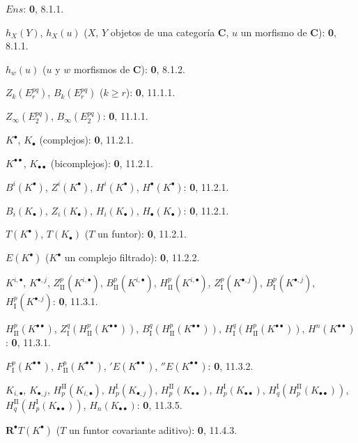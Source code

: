 \begin{flushleft}
$\boldsymbol{\mathit{Ens}}$: \textbf 0, 8.1.1.

$h_X(Y)$, $h_X(u)$ ($X$, $Y$ objetos de una categoría $\boldsymbol{C}$, $u$ un morfismo
de $\boldsymbol{C}$): \textbf 0, 8.1.1.

$h_w(u)$ ($u$ y $w$ morfismos de $\boldsymbol{C}$): \textbf 0, 8.1.2.

$Z_k(E_r^{pq})$, $B_k(E_r^{pq})$ ($k\geq r$): \textbf 0, 11.1.1.

$Z_\infty(E_2^{pq})$, $B_\infty(E_2^{pq})$: \textbf 0, 11.1.1.

$K^\bullet$, $K_\bullet$ (complejos): \textbf 0, 11.2.1.

$K^{\bullet\bullet}$, $K_{\bullet\bullet}$ (bicomplejos): \textbf 0, 11.2.1.

$B^i(K^\bullet)$, $Z^i(K^\bullet)$, $H^i(K^\bullet)$,
$H^\bullet(K^\bullet)$: \textbf 0, 11.2.1.

$B_i(K_\bullet)$, $Z_i(K_\bullet)$, $H_i(K_\bullet)$,
$H_\bullet(K_\bullet)$: \textbf 0, 11.2.1.

$T(K^\bullet)$, $T(K_\bullet)$ ($T$ un funtor): \textbf 0, 11.2.1.

$E(K^\bullet)$ ($K^\bullet$ un complejo filtrado): \textbf 0, 11.2.2.

$K^{i,\bullet}$, $K^{\bullet,j}$, $Z_{\mathrm{II}}^p(K^{i,\bullet})$,
$B_{\mathrm{II}}^p(K^{i,\bullet})$, $H_{\mathrm{II}}^p(K^{i,\bullet})$,
$Z_{\mathrm I}^p(K^{\bullet,j})$, $B_{\mathrm I}^p(K^{\bullet,j})$,
$H_{\mathrm I}^p(K^{\bullet,j})$: \textbf 0, 11.3.1.

$H_{\mathrm{II}}^p(K^{\bullet\bullet})$,
$Z_{\mathrm I}^q(H_{\mathrm{II}}^p(K^{\bullet\bullet}))$,
$B_{\mathrm I}^q(H_{\mathrm{II}}^p(K^{\bullet\bullet}))$,
$H_{\mathrm I}^q(H_{\mathrm{II}}^p(K^{\bullet\bullet}))$,
$H^n(K^{\bullet\bullet})$: \textbf 0, 11.3.1.

$F_{\mathrm I}^p(K^{\bullet\bullet})$,
$F_{\mathrm{II}}^p(K^{\bullet\bullet})$, ${}'E(K^{\bullet\bullet})$,
${}''E(K^{\bullet\bullet})$: \textbf 0, 11.3.2.

$K_{i,\bullet}$, $K_{\bullet,j}$, $H_p^{\mathrm{II}}(K_{i,\bullet})$,
$H_p^{\mathrm I}(K_{\bullet,j})$, $H_p^{\mathrm{II}}(K_{\bullet\bullet})$,
$H_p^{\mathrm I}(K_{\bullet\bullet})$,
$H_q^{\mathrm I}(H_p^{\mathrm{II}}(K_{\bullet\bullet}))$,
$H_q^{\mathrm{II}}(H_p^{\mathrm I}(K_{\bullet\bullet}))$,
$H_n(K_{\bullet\bullet})$: \textbf 0, 11.3.5.

$\mathbf R^\bullet T(K^\bullet)$ ($T$ un funtor covariante aditivo): \textbf 0, 11.4.3.


\end{flushleft}

